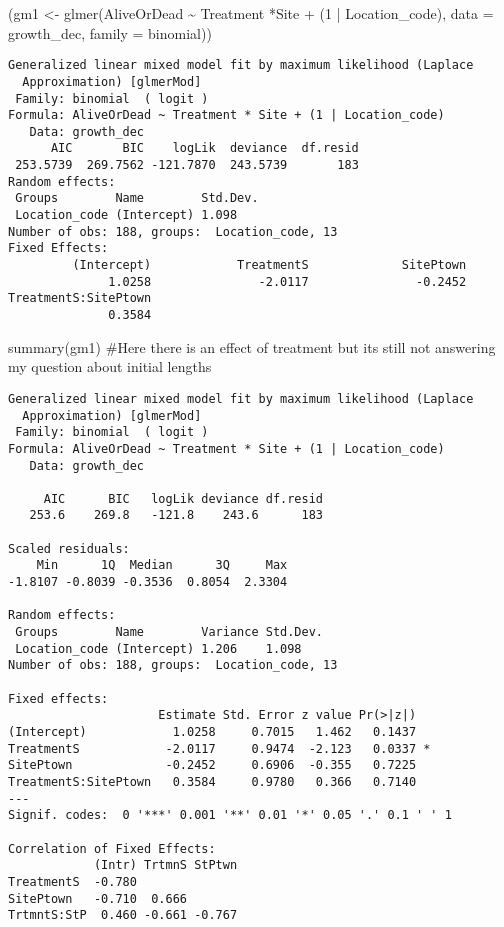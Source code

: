 \documentclass[
  letterpaper,
  DIV=11,
  numbers=noendperiod]{scrartcl}
\newenvironment{Shaded}{\begin{snugshade}}{\end{snugshade}}
\newcommand{\AttributeTok}[1]{\textcolor[rgb]{0.40,0.45,0.13}{#1}}
\newcommand{\CommentTok}[1]{\textcolor[rgb]{0.37,0.37,0.37}{#1}}
\newcommand{\DecValTok}[1]{\textcolor[rgb]{0.68,0.00,0.00}{#1}}
\newcommand{\FunctionTok}[1]{\textcolor[rgb]{0.28,0.35,0.67}{#1}}
\newcommand{\NormalTok}[1]{\textcolor[rgb]{0.00,0.23,0.31}{#1}}
\newcommand{\OtherTok}[1]{\textcolor[rgb]{0.00,0.23,0.31}{#1}}
\newcommand{\SpecialCharTok}[1]{\textcolor[rgb]{0.37,0.37,0.37}{#1}}
\begin{document}
\begin{Shaded}
\begin{Highlighting}[]
\NormalTok{(gm1 }\OtherTok{\textless{}{-}} \FunctionTok{glmer}\NormalTok{(AliveOrDead }\SpecialCharTok{\textasciitilde{}}\NormalTok{ Treatment }\SpecialCharTok{*}\NormalTok{Site }\SpecialCharTok{+}\NormalTok{ (}\DecValTok{1} \SpecialCharTok{|}\NormalTok{ Location\_code),}
              \AttributeTok{data =}\NormalTok{ growth\_dec, }\AttributeTok{family =}\NormalTok{ binomial))}
\end{Highlighting}
\end{Shaded}

\begin{verbatim}
Generalized linear mixed model fit by maximum likelihood (Laplace
  Approximation) [glmerMod]
 Family: binomial  ( logit )
Formula: AliveOrDead ~ Treatment * Site + (1 | Location_code)
   Data: growth_dec
      AIC       BIC    logLik  deviance  df.resid 
 253.5739  269.7562 -121.7870  243.5739       183 
Random effects:
 Groups        Name        Std.Dev.
 Location_code (Intercept) 1.098   
Number of obs: 188, groups:  Location_code, 13
Fixed Effects:
         (Intercept)            TreatmentS             SitePtown  
              1.0258               -2.0117               -0.2452  
TreatmentS:SitePtown  
              0.3584  
\end{verbatim}

\begin{Shaded}
\begin{Highlighting}[]
\FunctionTok{summary}\NormalTok{(gm1) }\CommentTok{\#Here there is an effect of treatment but it\textquotesingle{}s still not answering my question about initial lengths}
\end{Highlighting}
\end{Shaded}

\begin{verbatim}
Generalized linear mixed model fit by maximum likelihood (Laplace
  Approximation) [glmerMod]
 Family: binomial  ( logit )
Formula: AliveOrDead ~ Treatment * Site + (1 | Location_code)
   Data: growth_dec

     AIC      BIC   logLik deviance df.resid 
   253.6    269.8   -121.8    243.6      183 

Scaled residuals: 
    Min      1Q  Median      3Q     Max 
-1.8107 -0.8039 -0.3536  0.8054  2.3304 

Random effects:
 Groups        Name        Variance Std.Dev.
 Location_code (Intercept) 1.206    1.098   
Number of obs: 188, groups:  Location_code, 13

Fixed effects:
                     Estimate Std. Error z value Pr(>|z|)  
(Intercept)            1.0258     0.7015   1.462   0.1437  
TreatmentS            -2.0117     0.9474  -2.123   0.0337 *
SitePtown             -0.2452     0.6906  -0.355   0.7225  
TreatmentS:SitePtown   0.3584     0.9780   0.366   0.7140  
---
Signif. codes:  0 '***' 0.001 '**' 0.01 '*' 0.05 '.' 0.1 ' ' 1

Correlation of Fixed Effects:
            (Intr) TrtmnS StPtwn
TreatmentS  -0.780              
SitePtown   -0.710  0.666       
TrtmntS:StP  0.460 -0.661 -0.767
\end{verbatim}
\end{document}
